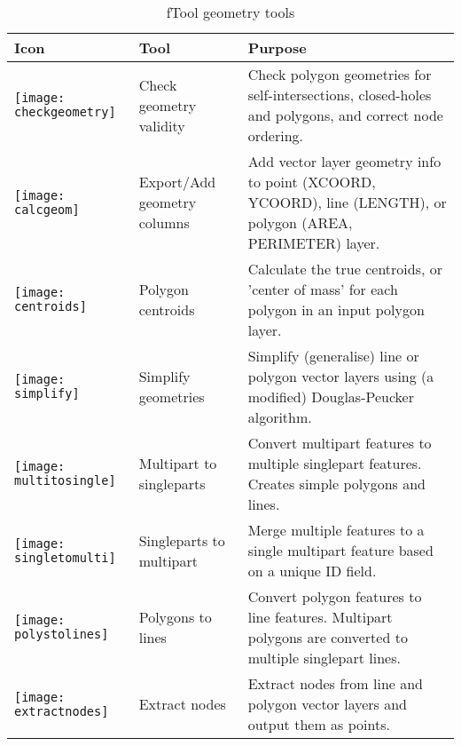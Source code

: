 \begin{table}[ht]
\centering
\caption{fTool geometry tools}\label{tab:ftool_geometry}\medskip
 \begin{tabular}{|p{0.3in}|p{1.2in}|p{4.7in}|}
 \hline \textbf{Icon} & \textbf{Tool} & \textbf{Purpose} \\
 \hline \texttt{[image: checkgeometry]} & Check geometry validity & Check polygon geometries for self-intersections, closed-holes and polygons, and correct node ordering. \\
 \hline \texttt{[image: calcgeom]} & Export/Add geometry columns & Add vector layer geometry info to point (XCOORD, YCOORD), line (LENGTH), or polygon (AREA, PERIMETER) layer. \\
 \hline \texttt{[image: centroids]} & Polygon centroids & Calculate the true centroids, or 'center of mass' for each polygon in an input polygon layer. \\
 \hline \texttt{[image: simplify]} & Simplify geometries & Simplify (generalise) line or polygon vector layers using (a modified) Douglas-Peucker algorithm. \\
 \hline \texttt{[image: multitosingle]} & Multipart to singleparts & Convert multipart features to multiple singlepart features. Creates simple polygons and lines. \\
 \hline \texttt{[image: singletomulti]} & Singleparts to multipart & Merge multiple features to a single multipart feature based on a unique ID field. \\
 \hline \texttt{[image: polystolines]} & Polygons to lines & Convert polygon features to line features. Multipart polygons are converted to multiple singlepart lines. \\
 \hline \texttt{[image: extractnodes]} & Extract nodes & Extract nodes from line and polygon vector layers and output them as points. \\
 \hline
\end{tabular}
\end{table}


